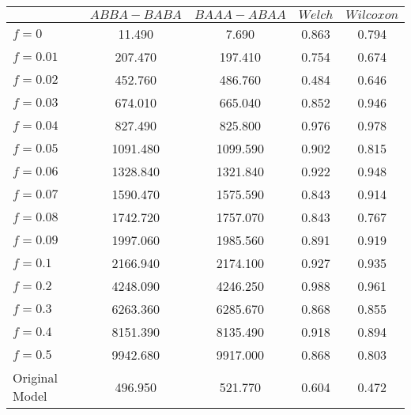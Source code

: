 \begin{tabular}{lcccc}
\toprule
 & $ABBA-BABA$ & $BAAA-ABAA$ & $Welch$ & $Wilcoxon$ \\
\midrule
$f = 0$ & 11.490 & 7.690 & 0.863 & 0.794 \\
$f = 0.01$ & 207.470 & 197.410 & 0.754 & 0.674 \\
$f = 0.02$ & 452.760 & 486.760 & 0.484 & 0.646 \\
$f = 0.03$ & 674.010 & 665.040 & 0.852 & 0.946 \\
$f = 0.04$ & 827.490 & 825.800 & 0.976 & 0.978 \\
$f = 0.05$ & 1091.480 & 1099.590 & 0.902 & 0.815 \\
$f = 0.06$ & 1328.840 & 1321.840 & 0.922 & 0.948 \\
$f = 0.07$ & 1590.470 & 1575.590 & 0.843 & 0.914 \\
$f = 0.08$ & 1742.720 & 1757.070 & 0.843 & 0.767 \\
$f = 0.09$ & 1997.060 & 1985.560 & 0.891 & 0.919 \\
$f = 0.1$ & 2166.940 & 2174.100 & 0.927 & 0.935 \\
$f = 0.2$ & 4248.090 & 4246.250 & 0.988 & 0.961 \\
$f = 0.3$ & 6263.360 & 6285.670 & 0.868 & 0.855 \\
$f = 0.4$ & 8151.390 & 8135.490 & 0.918 & 0.894 \\
$f = 0.5$ & 9942.680 & 9917.000 & 0.868 & 0.803 \\
Original Model & 496.950 & 521.770 & 0.604 & 0.472 \\
\bottomrule
\end{tabular}
